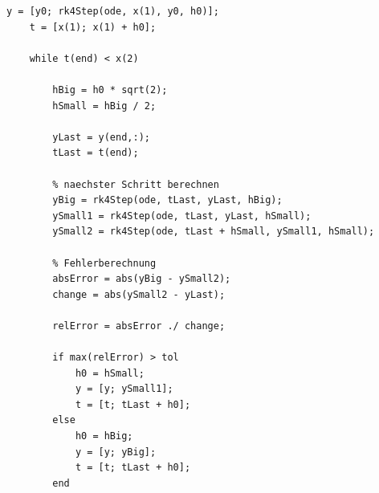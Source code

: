 \begin{refsection}
\begin{lstlisting}[style=Matlab, caption=Variable Schrittl"ange, captionpos=b, label=code:myOde]
    y = [y0; rk4Step(ode, x(1), y0, h0)]; 
    t = [x(1); x(1) + h0];
    
    while t(end) < x(2)
        
        hBig = h0 * sqrt(2);
        hSmall = hBig / 2;
        
        yLast = y(end,:);
        tLast = t(end);
        
        % naechster Schritt berechnen
        yBig = rk4Step(ode, tLast, yLast, hBig);
        ySmall1 = rk4Step(ode, tLast, yLast, hSmall);
        ySmall2 = rk4Step(ode, tLast + hSmall, ySmall1, hSmall);
        
        % Fehlerberechnung
        absError = abs(yBig - ySmall2);
        change = abs(ySmall2 - yLast);
        
        relError = absError ./ change;
        
        if max(relError) > tol
            h0 = hSmall;
            y = [y; ySmall1];
            t = [t; tLast + h0];
        else
            h0 = hBig;
            y = [y; yBig]; 
            t = [t; tLast + h0];           
        end
         

\end{lstlisting}
\end{refsection}
